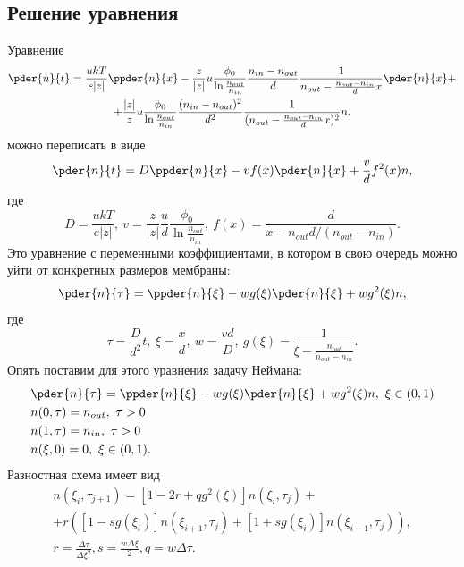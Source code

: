 \documentclass{hedwork}
\begin{document}
\subsection{Решение уравнения}
    Уравнение
    \begin{gather}
        \pder{n}{t} = \frac{ukT}{e|z|}\ppder{n}{x} -
        \frac{z}{|z|}u\frac{\phi_0}{\ln\frac{n_{out}}{n_{in}}}
        \frac{n_{in} - n_{out}}{d}
        \frac{1}{n_{out} - \frac{n_{out} - n_{in}}{d} x}
        \pder{n}{x} + \nonumber \\
        + \frac{|z|}{z}u\frac{\phi_0}{\ln\frac{n_{out}}{n_{in}}}
        \frac{(n_{in} - n_{out})^2}{d^2}
        \frac{1}{(n_{out} - \frac{n_{out} - n_{in}}{d} x)^2}n.
    \end{gather}
    можно переписать в виде
    \begin{equation}
        \pder{n}{t} = D\ppder{n}{x} - vf(x)\pder{n}{x} + \frac{v}{d}f^2(x)n,
    \end{equation}
    где
    \begin{equation}
        D = \frac{ukT}{e|z|},\ v = \frac{z}{|z|}\frac{u}{d}
        \frac{\phi_0}{\ln\frac{n_{out}}{n_{in}}},
        \ f(x) = \frac{d}{x - n_{out}d / (n_{out}-n_{in})}.
    \end{equation}
    Это уравнение с переменными коэффициентами, в котором в свою очередь можно
    уйти от конкретных размеров мембраны:
    \begin{equation}
        \pder{n}{\tau} = \ppder{n}{\xi} - wg(\xi)\pder{n}{\xi} + wg^2(\xi)n,
    \end{equation}
    где
    \begin{equation}
        \tau = \frac{D}{d^2}t,\ \xi = \frac{x}{d},\ w = \frac{vd}{D},
        \ g(\xi) = \frac{1}{\xi - \frac{n_{out}}{n_{out} - n_{in}}}.
    \end{equation}
    Опять поставим для этого уравнения задачу Неймана:
    \begin{align*}
        & \pder{n}{\tau} = \ppder{n}{\xi} - wg(\xi)\pder{n}{\xi} + wg^2(\xi)n,
            \ \xi\in(0,1) \\
        & n(0, \tau) = n_{out},\ \tau>0 \\
        & n(1, \tau) = n_{in},\ \tau>0 \\
        & n(\xi, 0) = 0,\ \xi\in(0,1).
    \end{align*}
    Разностная схема имеет вид
    \begin{gather*}
        n(\xi_i,\tau_{j+1}) =
        [1-2r+qg^2(\xi)]n(\xi_i, \tau_j) +\\
        + r\left(
            [1 - sg(\xi_i)]n(\xi_{i+1},\tau_j) +
            [1 + sg(\xi_i)]n(\xi_{i-1},\tau_j)
        \right),\\
        r = \frac{\Delta\tau}{\Delta\xi^2}, s = \frac{w\Delta\xi}{2},
        q = w\Delta\tau.
    \end{gather*}
\end{document}
